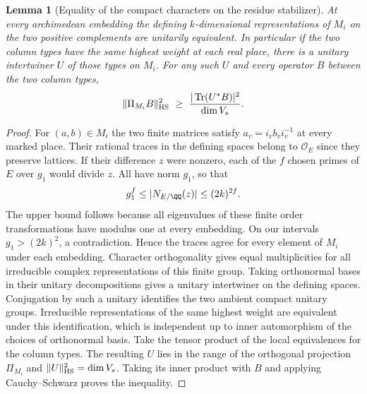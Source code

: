 \documentclass[a4paper,11pt]{article}
\newtheorem{lemma}[proposition]{Lemma}
\theoremstyle{definition}
\theoremstyle{remark}
\numberwithin{equation}{section}
\begin{document}
\begin{lemma}[Equality of the compact characters on the residue stabilizer]
\leavevmode\label{lem:matchedcompact532}
At every archimedean embedding the defining \(k\)-dimensional
representations of \(M_i\) on the two positive complements are
unitarily equivalent. In particular if the two column types have
the same highest weight at each real place, there is a unitary
intertwiner \(U\) of those types on \(M_i\). For any such \(U\)
and every operator \(B\) between the two column types,
\[
       \|\Pi_{M_i}B\|_{\rm HS}^2
           \ \ge\ \frac{|\operatorname{Tr}(U^*B)|^2}{\dim V_s}.
\]
\end{lemma}
\begin{proof}
For \((a,b)\in M_i\) the two finite matrices satisfy
\(a_v=i_v b_v i_v^{-1}\) at every marked place. Their rational
traces in the defining spaces belong to \(\mathcal O_E\) since
they preserve lattices. If their difference \(z\) were nonzero,
each of the \(f\) chosen primes of \(E\) over \(g_1\) would
divide \(z\). All have norm \(g_1\), so that
\[
                g_1^f\le |N_{E/\QQ}(z)|\le(2k)^{2f}.
\]
The upper bound follows because all eigenvalues of these finite
order transformations have modulus one at every embedding.
On our intervals \(g_1>(2k)^2\), a contradiction. Hence the
traces agree for every element of \(M_i\) under each embedding.
Character orthogonality gives equal multiplicities for all
irreducible complex representations of this finite group.
Taking orthonormal bases in their unitary decompositions gives
a unitary intertwiner on the defining spaces. Conjugation by
such a unitary identifies the two ambient compact unitary groups.
Irreducible representations of the same highest weight are
equivalent under this identification, which is independent up
to inner automorphism of the choices of orthonormal basis.
Take the tensor product of the local equivalences for the column
types. The resulting \(U\) lies in the range of the orthogonal
projection \(\Pi_{M_i}\) and \(\|U\|_{\rm HS}^2=\dim V_s\).
Taking its inner product with \(B\) and applying Cauchy--Schwarz
proves the inequality.
\end{proof}
\end{document}
